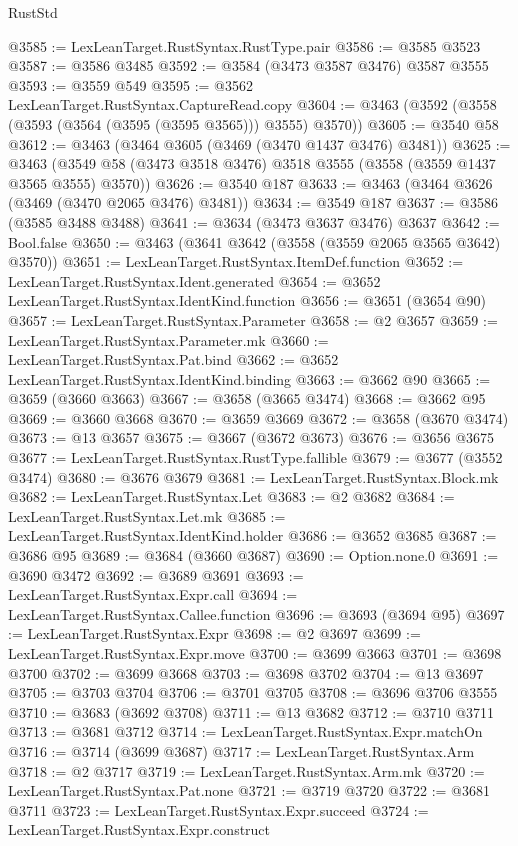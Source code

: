 \begin{lexlean}{RustStd}
\begin{coremodule}
{\begin{coremodule}
{{{{{{{{{{{{{{{{{{{{{{{{{{{{{{{{{{{{{{{{{{{{{{{@3585 := LexLeanTarget.RustSyntax.RustType.pair
@3586 := @3585 @3523
@3587 := @3586 @3485
@3592 := @3584 (@3473 @3587 @3476) @3587 @3555
@3593 := @3559 @549
@3595 := @3562 LexLeanTarget.RustSyntax.CaptureRead.copy
@3604 := @3463 (@3592 (@3558 (@3593 (@3564 (@3595 (@3595 @3565))) @3555) @3570))
@3605 := @3540 @58
@3612 := @3463 (@3464 @3605 (@3469 (@3470 @1437 @3476) @3481))
@3625 := @3463 (@3549 @58 (@3473 @3518 @3476) @3518 @3555 (@3558 (@3559 @1437 @3565 @3555) @3570))
@3626 := @3540 @187
@3633 := @3463 (@3464 @3626 (@3469 (@3470 @2065 @3476) @3481))
@3634 := @3549 @187
@3637 := @3586 (@3585 @3488 @3488)
@3641 := @3634 (@3473 @3637 @3476) @3637
@3642 := Bool.false
@3650 := @3463 (@3641 @3642 (@3558 (@3559 @2065 @3565 @3642) @3570))
@3651 := LexLeanTarget.RustSyntax.ItemDef.function
@3652 := LexLeanTarget.RustSyntax.Ident.generated
@3654 := @3652 LexLeanTarget.RustSyntax.IdentKind.function
@3656 := @3651 (@3654 @90)
@3657 := LexLeanTarget.RustSyntax.Parameter
@3658 := @2 @3657
@3659 := LexLeanTarget.RustSyntax.Parameter.mk
@3660 := LexLeanTarget.RustSyntax.Pat.bind
@3662 := @3652 LexLeanTarget.RustSyntax.IdentKind.binding
@3663 := @3662 @90
@3665 := @3659 (@3660 @3663)
@3667 := @3658 (@3665 @3474)
@3668 := @3662 @95
@3669 := @3660 @3668
@3670 := @3659 @3669
@3672 := @3658 (@3670 @3474)
@3673 := @13 @3657
@3675 := @3667 (@3672 @3673)
@3676 := @3656 @3675
@3677 := LexLeanTarget.RustSyntax.RustType.fallible
@3679 := @3677 (@3552 @3474)
@3680 := @3676 @3679
@3681 := LexLeanTarget.RustSyntax.Block.mk
@3682 := LexLeanTarget.RustSyntax.Let
@3683 := @2 @3682
@3684 := LexLeanTarget.RustSyntax.Let.mk
@3685 := LexLeanTarget.RustSyntax.IdentKind.holder
@3686 := @3652 @3685
@3687 := @3686 @95
@3689 := @3684 (@3660 @3687)
@3690 := Option.none.{0}
@3691 := @3690 @3472
@3692 := @3689 @3691
@3693 := LexLeanTarget.RustSyntax.Expr.call
@3694 := LexLeanTarget.RustSyntax.Callee.function
@3696 := @3693 (@3694 @95)
@3697 := LexLeanTarget.RustSyntax.Expr
@3698 := @2 @3697
@3699 := LexLeanTarget.RustSyntax.Expr.move
@3700 := @3699 @3663
@3701 := @3698 @3700
@3702 := @3699 @3668
@3703 := @3698 @3702
@3704 := @13 @3697
@3705 := @3703 @3704
@3706 := @3701 @3705
@3708 := @3696 @3706 @3555
@3710 := @3683 (@3692 @3708)
@3711 := @13 @3682
@3712 := @3710 @3711
@3713 := @3681 @3712
@3714 := LexLeanTarget.RustSyntax.Expr.matchOn
@3716 := @3714 (@3699 @3687)
@3717 := LexLeanTarget.RustSyntax.Arm
@3718 := @2 @3717
@3719 := LexLeanTarget.RustSyntax.Arm.mk
@3720 := LexLeanTarget.RustSyntax.Pat.none
@3721 := @3719 @3720
@3722 := @3681 @3711
@3723 := LexLeanTarget.RustSyntax.Expr.succeed
@3724 := LexLeanTarget.RustSyntax.Expr.construct
}}}}}}}}}}}}}}}}}}}}}}}}}}}}}}}}}}}}}}}}}}}}}}}
\end{coremodule}}
\end{coremodule}
\end{lexlean}
